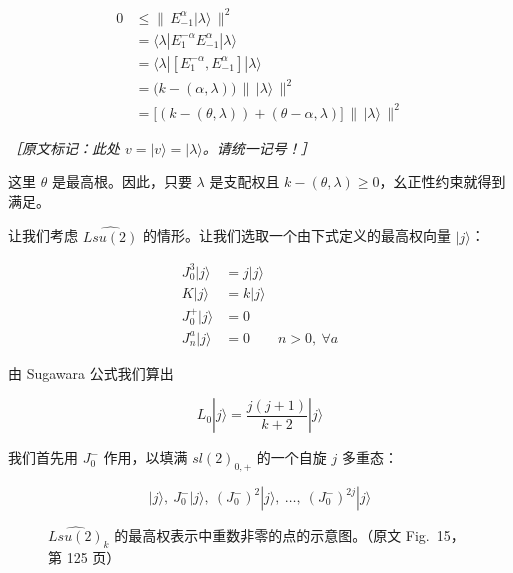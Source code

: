 \begin{equation}
  \begin{aligned}
    0 &\le \|\,E^\alpha_{-1}|\lambda\rangle\,\|^2\\
    &= \langle\lambda|E^{-\alpha}_1E^\alpha_{-1}|\lambda\rangle\\
    &= \langle\lambda|[E^{-\alpha}_1,E^\alpha_{-1}]|\lambda\rangle\\
    &= \big(k-(\alpha,\lambda)\big)\,\|\,|\lambda\rangle\,\|^2\\
    &= \big[(k-(\theta,\lambda))+(\theta-\alpha,\lambda)\big]\,\|\,|\lambda\rangle\,\|^2
  \end{aligned}
  \tag{4.134}
  \label{eq:4.134}
\end{equation}

{\small\itshape ［原文标记：此处 $v=|v\rangle=|\lambda\rangle$。请统一记号！］}

这里 $\theta$ 是最高根。因此，只要 $\lambda$ 是支配权且 $k-(\theta,\lambda)\ge0$，幺正性约束就得到满足。

让我们考虑 $\widehat{Lsu(2)}$ 的情形。让我们选取一个由下式定义的最高权向量 $|j\rangle$：

\begin{equation}
  \begin{aligned}
    J^3_0|j\rangle &= j|j\rangle\\
    K|j\rangle &= k|j\rangle\\
    J^+_0|j\rangle &= 0\\
    J^a_n|j\rangle &= 0\qquad n>0,\ \forall a
  \end{aligned}
  \tag{4.135}
  \label{eq:4.135}
\end{equation}

由 Sugawara 公式我们算出

\begin{equation}
  L_0|j\rangle=\frac{j(j+1)}{k+2}|j\rangle
  \tag{4.136}
  \label{eq:4.136}
\end{equation}

我们首先用 $J^-_0$ 作用，以填满 $sl(2)_{0,+}$ 的一个自旋 $j$ 多重态：

\begin{equation}
  |j\rangle,\ J^-_0|j\rangle,\ (J^-_0)^2|j\rangle,\ \dots,\ (J^-_0)^{2j}|j\rangle
  \tag{4.137}
  \label{eq:4.137}
\end{equation}

\begin{figure}[htbp]
  \centering
  \MissingFigureNote
  \caption{$\widehat{Lsu(2)}_k$ 的最高权表示中重数非零的点的示意图。（原文 Fig.~15，第 125 页）}
  \label{fig:15}
\end{figure}

